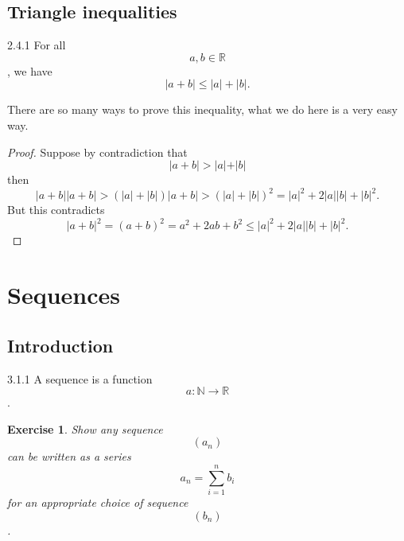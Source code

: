 \documentclass[a4paper]{article}
\def\rr{{\mathbb R}}
\def\nn{{\mathbb N}}
\newtheorem{exercise}{Exercise}[subsection]
\begin{document}
\subsection{Triangle inequalities}
\begin{theorem}{2.4.1}{}
    For all $$a,b\in \rr$$, we have 
    \begin{equation*}
        |a+b\vert \leq |a\vert +|b\vert .
    \end{equation*}
\end{theorem}
There are so many ways to prove this inequality, what we do here is a very easy way.
\begin{proof}
    Suppose by contradiction that $$|a+b\vert >|a|+|b| $$then
    \begin{equation*}
        |a+b||a+b|>(|a|+|b|)|a+b|>(|a|+|b|)^2=|a|^2+2|a||b|+|b|^2.
    \end{equation*}
    But this contradicts
    \begin{equation*}
        |a+b|^2=(a+b)^2=a^2+2ab+b^2\leq |a|^2+2|a||b|+|b|^2.
    \end{equation*}
\end{proof}
\newpage
\section{Sequences}
\subsection{Introduction}
\begin{definition}{3.1.1}{}
    A sequence is a function $$a:\nn \rightarrow \rr$$.
\end{definition}
\begin{exercise}
    Show any sequence$$(a_n)$$ can be written as a series $$a_n=\sum_{i=1}^n b_i$$ for an appropriate choice of sequence $$(b_n)$$.
\end{exercise}
\end{document}
